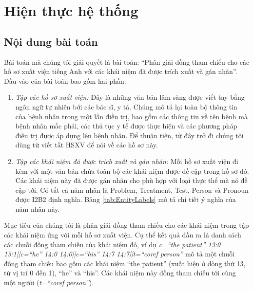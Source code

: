 \chapter{Hiện thực hệ thống} \label{hienthuchethong}
\section{Nội dung bài toán}
Bài toán mà chúng tôi giải quyết là bài toán: ``Phân giải đồng tham chiếu cho các hồ sơ xuất viện tiếng Anh với các khái niệm đã được trích xuất và gán nhãn''. Đầu vào của bài toán bao gồm hai phần:

\begin{enumerate}[leftmargin=\the\parindent]
\item \emph{Tập các hồ sơ xuất viện: }Đây là những văn bản lâm sàng được viết tay bằng ngôn ngữ tự nhiên bởi các bác sĩ, y tá. Chúng mô tả lại toàn bộ thông tin của bệnh nhân trong một lần điều trị, bao gồm các thông tin về tên bệnh mà bệnh nhân mắc phải, các thủ tục y tế được thực hiện và các phương pháp điều trị được áp dụng lên bệnh nhân. Để thuận tiện, từ đây trở đi chúng tôi dùng từ viết tắt HSXV để nói về các hồ sơ này.
\item \emph{Tập các khái niệm đã được trích xuất và gán nhãn:} Mỗi hồ sơ xuất viện đi kèm với một văn bản chứa toàn bộ các khái niệm được đề cập trong hồ sơ đó. Các khái niệm này đã được gán nhãn cho phù hợp với loại thực thể mà nó đề cập tới. Có tất cả năm nhãn là Problem, Treatment, Test, Person và Pronoun được I2B2 định nghĩa. Bảng \ref{tab:EntityLabels} mô tả chi tiết ý nghĩa của năm nhãn này.
\end{enumerate}

Mục tiêu của chúng tôi là phân giải đồng tham chiếu cho các khái niệm trong tập các khái niệm ứng với mỗi hồ sơ xuất viện. Cụ thể kết quả đầu ra là danh sách các chuỗi đồng tham chiếu của khái niệm đó, ví dụ \emph{c=``the patient'' 13:0 13:1||c=``he'' 14:0 14:0||c=``his'' 14:7 14:7||t=``coref person''} mô tả một chuỗi đồng tham chiếu bao gồm các khái niệm ``the patient'' (xuất hiện ở dòng thứ 13, từ vị trí 0 đến 1), ``he'' và ``his''. Các khái niệm này đồng tham chiếu tới cùng một người (\emph{t=``coref person''}).

